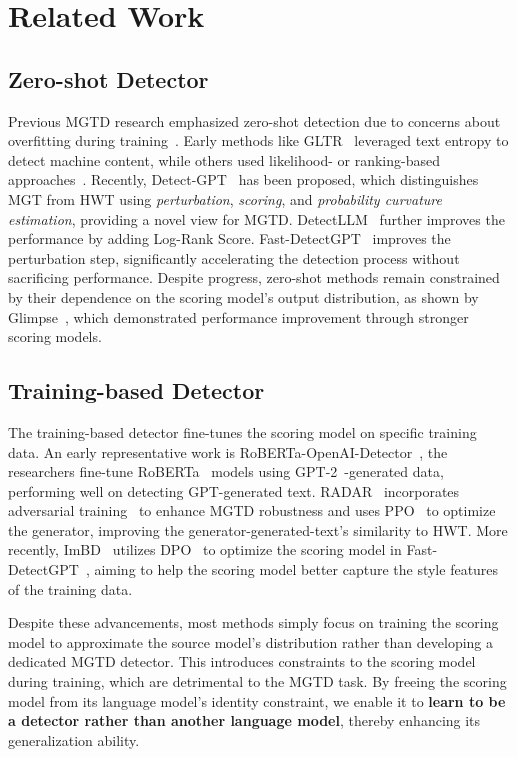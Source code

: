 \section{Related Work}
\subsection{Zero-shot Detector}
Previous MGTD research emphasized zero-shot detection due to concerns about overfitting during training~\cite{outdomain, overfit}. 
%
Early methods like GLTR~\cite{entropy} leveraged text entropy to detect machine content, while others used likelihood- or ranking-based approaches~\cite{likelihood, logrank}.
%
Recently, Detect-GPT~\cite{detectgpt} has been proposed, which distinguishes MGT from HWT using \textit{perturbation}, \textit{scoring}, and \textit{probability curvature estimation}, providing a novel view for MGTD.
%
%
DetectLLM~\cite{lrrandnpr} further improves the performance by adding Log-Rank Score.
%
Fast-DetectGPT~\cite{fastdetectgpt} improves the perturbation step, significantly accelerating the detection process without sacrificing performance.
%
Despite progress, zero-shot methods remain constrained by their dependence on the scoring model’s output distribution, as shown by Glimpse~\cite{glimpse}, which demonstrated performance improvement through stronger scoring models.


\subsection{Training-based Detector}
The training-based detector fine-tunes the scoring model on specific training data.
%
An early representative work is RoBERTa-OpenAI-Detector~\cite{likelihood}, the researchers fine-tune RoBERTa~\cite{roberta} models using GPT-2~\cite{gpt2}-generated data, performing well on detecting GPT-generated text.
%
RADAR~\cite{radar} incorporates adversarial training~\cite{gan} to enhance MGTD robustness and uses PPO~\cite{ppo} to optimize the generator, improving the generator-generated-text's similarity to HWT. 
%
More recently, ImBD~\cite{imbd} utilizes DPO~\cite{dpo} to optimize the scoring model in Fast-DetectGPT~\cite{fastdetectgpt}, aiming to help the scoring model better capture the style features of the training data.

Despite these advancements, most methods simply focus on training the scoring model to approximate the source model’s distribution rather than developing a dedicated MGTD detector. 
%
This introduces constraints to the scoring model during training, which are detrimental to the MGTD task.
%
By freeing the scoring model from its language model's identity constraint, we enable it to \textbf{learn to be a detector rather than another language model}, thereby enhancing its generalization ability.


